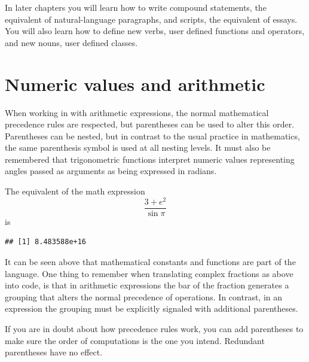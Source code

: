 \documentclass[krantz2]{krantz}\usepackage{knitr}%
\begin{document}
In later chapters you will learn how to write compound statements, the equivalent of natural-language paragraphs, and scripts, the equivalent of essays. You will also learn how to define new verbs, user defined functions and operators, and new nouns, user defined classes.

\section{Numeric values and arithmetic}
\qRoperator{+}\qRoperator{-}\qRoperator{*}\qRoperator{/}
When working in \Rlang with arithmetic expressions, the normal mathematical precedence rules are respected, but parentheses can be used to alter this order. Parentheses can be nested, but in contrast to the usual practice in mathematics, the same parenthesis symbol is used at all nesting levels. It must also be remembered that trigonometric \Rlang functions interpret numeric values representing angles passed as arguments as being expressed in radians.

The equivalent of the math expression
$$
\frac{3 + e^2}{\sin \pi}
$$
is
\begin{knitrout}\footnotesize
{}\color{fgcolor}\begin{kframe}
\begin{alltt}
\hlstd{(} \hlopt{+} \hlstd{(}\hlstd{))} \hlopt{/} 
\end{alltt}
\begin{verbatim}
## [1] 8.483588e+16
\end{verbatim}
\end{kframe}
\end{knitrout}

It can be seen above that mathematical constants and functions are part of the \Rlang language. One thing to remember when translating complex fractions as above into \Rlang code, is that in arithmetic expressions the bar of the fraction generates a grouping that alters the normal precedence of operations. In contrast, in an \Rlang expression the grouping must be explicitly signaled with additional parentheses.

If you are in doubt about how precedence rules work, you can add parentheses to make sure the order of computations is the one you intend. Redundant parentheses have no effect.
\end{document}
